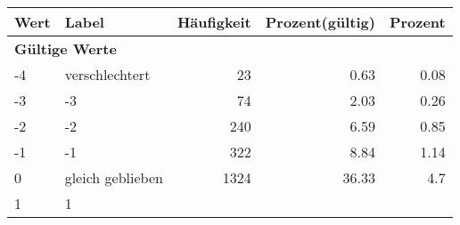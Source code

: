      \begin{longtable}{lXrrr}
     \toprule
     \textbf{Wert} & \textbf{Label} & \textbf{Häufigkeit} & \textbf{Prozent(gültig)} & \textbf{Prozent} \\
     \endhead
     \midrule
     \multicolumn{5}{l}{\textbf{Gültige Werte}}\\

     -4 &
     \multicolumn{1}{X}{ verschlechtert   } &


       \num{23} &
       \num[round-mode=places,round-precision=2]{0,63} &
         \num[round-mode=places,round-precision=2]{0,08} \\

     -3 &
     \multicolumn{1}{X}{ -3   } &


       \num{74} &
       \num[round-mode=places,round-precision=2]{2,03} &
         \num[round-mode=places,round-precision=2]{0,26} \\

     -2 &
     \multicolumn{1}{X}{ -2   } &


       \num{240} &
       \num[round-mode=places,round-precision=2]{6,59} &
         \num[round-mode=places,round-precision=2]{0,85} \\

     -1 &
     \multicolumn{1}{X}{ -1   } &


       \num{322} &
       \num[round-mode=places,round-precision=2]{8,84} &
         \num[round-mode=places,round-precision=2]{1,14} \\

     0 &
     \multicolumn{1}{X}{ gleich geblieben   } &


       \num{1324} &
       \num[round-mode=places,round-precision=2]{36,33} &
         \num[round-mode=places,round-precision=2]{4,7} \\

     1 &
     \multicolumn{1}{X}{ 1   } &



\end{longtable}

